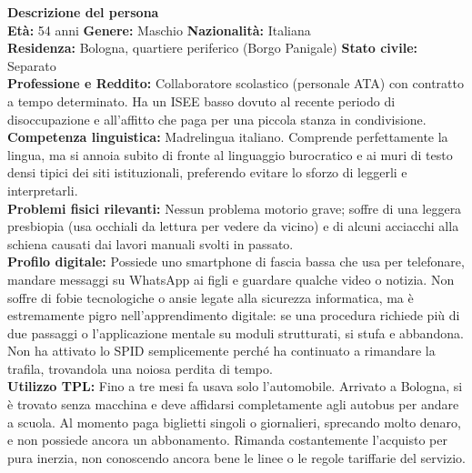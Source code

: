 \documentclass[11pt,a4paper]{article}
\begin{document}
\begin{tcolorbox}[colback=backgroundColor,colframe=borderColor,arc=2mm]
    \textbf{Descrizione del persona} \\[4pt]
    {\small
    \textbf{Età:} 54 anni \hfill
    \textbf{Genere:} Maschio \hfill
    \textbf{Nazionalità:} Italiana
    \\[2pt]
    \textbf{Residenza:} Bologna, quartiere periferico (Borgo Panigale) \hfill
    \textbf{Stato civile:} Separato \\[2pt]
    \textbf{Professione e Reddito:} Collaboratore scolastico (personale ATA) con contratto a tempo determinato. Ha un ISEE basso dovuto al recente periodo di disoccupazione e all'affitto che paga per una piccola stanza in condivisione. \\[2pt]
    \textbf{Competenza linguistica:} Madrelingua italiano. Comprende perfettamente la lingua, ma si annoia subito di fronte al linguaggio burocratico e ai muri di testo densi tipici dei siti istituzionali, preferendo evitare lo sforzo di leggerli e interpretarli. \\[2pt]
    \textbf{Problemi fisici rilevanti:} Nessun problema motorio grave; soffre di una leggera presbiopia (usa occhiali da lettura per vedere da vicino) e di alcuni acciacchi alla schiena causati dai lavori manuali svolti in passato. \\[2pt]
    \textbf{Profilo digitale:} Possiede uno smartphone di fascia bassa che usa per telefonare, mandare messaggi su WhatsApp ai figli e guardare qualche video o notizia. Non soffre di fobie tecnologiche o ansie legate alla sicurezza informatica, ma è estremamente pigro nell'apprendimento digitale: se una procedura richiede più di due passaggi o l'applicazione mentale su moduli strutturati, si stufa e abbandona. Non ha attivato lo SPID semplicemente perché ha continuato a rimandare la trafila, trovandola una noiosa perdita di tempo. \\[2pt]
    \textbf{Utilizzo TPL:} Fino a tre mesi fa usava solo l'automobile. Arrivato a Bologna, si è trovato senza macchina e deve affidarsi completamente agli autobus per andare a scuola. Al momento paga biglietti singoli o giornalieri, sprecando molto denaro, e non possiede ancora un abbonamento. Rimanda costantemente l'acquisto per pura inerzia, non conoscendo ancora bene le linee o le regole tariffarie del servizio.
    }
\end{tcolorbox}

\vspace{0.3cm}
\end{document}

